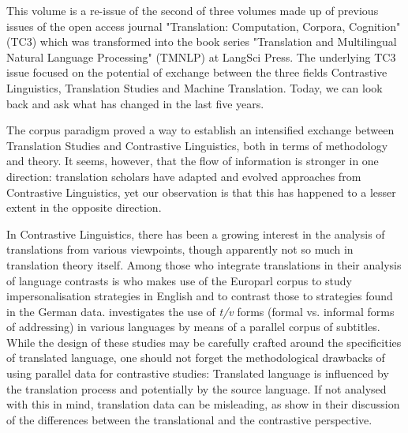



This volume is a re-issue of the second of three volumes made up of previous issues of the open access journal "Translation: Computation, Corpora, Cognition" (TC3) which was transformed into the book series "Translation and Multilingual Natural Language Processing" (TMNLP) at LangSci Press. The underlying TC3 issue focused on the potential of exchange between the three fields Contrastive Linguistics, Translation Studies and Machine Translation. Today, we can look back and ask what has changed in the last five years. 

The corpus paradigm proved a way to establish an intensified exchange between Translation Studies and Contrastive Linguistics, both in terms of methodology and theory. It seems, however, that the flow of information is stronger in one direction: translation scholars have adapted and evolved approaches from Contrastive Linguistics, yet our observation is that this has happened to a lesser extent in the opposite direction.

In Contrastive Linguistics, there has been a growing interest in the analysis of translations from various viewpoints, though apparently not so much in translation theory itself. Among those who integrate translations in their analysis of language contrasts is \citet{Gast2015} who makes use of the Europarl corpus to study impersonalisation strategies in English and to contrast those to strategies found in the German data. \citet{Levshina2017} investigates the use of \textit{t/v} forms (formal vs. informal forms of addressing) in various languages by means of a parallel corpus of subtitles. While the design of these studies may be carefully crafted around the specificities of translated language, one should not forget the methodological drawbacks of using parallel data for contrastive studies: Translated language is influenced by the translation process and potentially by the source language. If not analysed with this in mind, translation data can be misleading, as \citet{Neumann_HansenSchirra2013} show in their discussion of the differences between the translational and the contrastive perspective.

